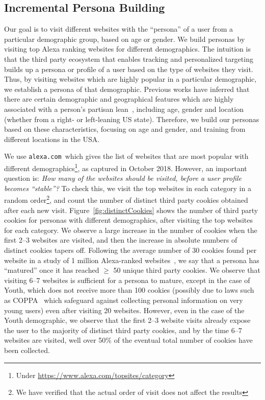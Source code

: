 \documentclass{article}
\newcommand{\alexa}{\texttt{alexa.com}}
\begin{document}
\subsection{Incremental Persona Building}\label{sec:personaBuild}

Our goal is to visit different websites with the ``persona'' of a user from a particular demographic group, based on age or gender.
We build personas by visiting top Alexa ranking websites for different demographics.
The intuition is that the third party ecosystem that enables tracking and personalized targeting~\cite{carrascosa2015,programmaticAd,ballard2016campaigning} builds up a persona or profile of a user based on the type of websites they visit.
Thus, by visiting websites which are highly popular in a particular demographic, we establish a persona of that demographic.
Previous works have inferred that there are certain demographic and geographical features which are highly associated with a person's partisan lean~\cite{bhatt2018illuminating}, including age, gender and location (whether from a right- or left-leaning US state).
Therefore, we build our personas based on these characteristics, focusing on age and gender, and training from different locations in the USA.

We use \alexa\ which gives the list of websites that are most popular with different demographics\footnote{Under \url{https://www.alexa.com/topsites/category}}, as captured in October 2018.
However, an important question is: \emph{How many of the websites should be visited, before a user profile becomes ``stable''?}
To check this, we visit the top websites in each category in a random order\footnote{We have verified that the actual order of visit does not affect the results}, and count the number of distinct third party cookies obtained after each new visit.
Figure~\ref{fig:distinctCookies} shows the number of third party cookies for personas with different demographics, after visiting the top websites for each category.
We observe a large increase in the number of cookies when the first 2--3 websites are visited, and then the increase in absolute numbers of distinct cookies tapers off. 
Following the average number of 30 cookies found per website in a study of 1 million Alexa-ranked websites~\cite{englehardt2016online}, we say that a persona has ``matured'' once it has reached $\geq$ 50 unique third party cookies.
We observe that visiting 6--7 websites is sufficient for a persona to mature, except in the case of Youth, which does not receive more than 100 cookies (possibly due to laws such as COPPA~\cite{coppa} which safeguard against collecting personal information on very young users) even after visiting 20 websites.
However, even in the case of the Youth demographic, we observe that the first 2--3 website visits already expose the user to the majority of distinct third party cookies, and by the time 6--7 websites are visited, well over 50\% of the eventual total number of cookies have been collected. 
\end{document}

